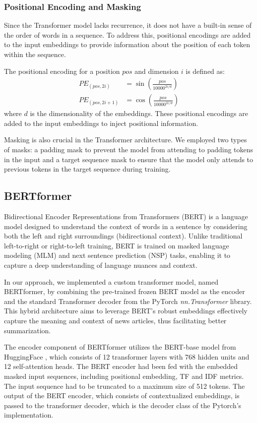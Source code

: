 \subsubsection{Positional Encoding and Masking}

Since the Transformer model lacks recurrence, it does not have a built-in sense of the order of words in a sequence. To address this, positional encodings are added to the input embeddings to provide information about the position of each token within the sequence.

The positional encoding for a position \(pos\) and dimension \(i\) is defined as:
\begin{equation}
	\begin{aligned}
		PE_{(pos, 2i)} &= \sin\left(\frac{pos}{10000^{2i/d}}\right) \\
		PE_{(pos, 2i+1)} &= \cos\left(\frac{pos}{10000^{2i/d}}\right)
	\end{aligned}
\end{equation}
where \(d\) is the dimensionality of the embeddings. These positional encodings are added to the input embeddings to inject positional information.

Masking is also crucial in the Transformer architecture. We employed two types of masks: a padding mask to prevent the model from attending to padding tokens in the input and a target sequence mask to ensure that the model only attends to previous tokens in the target sequence during training.


\subsection{BERTformer}
Bidirectional Encoder Representations from Transformers (BERT)\cite{devlin2018bert} is a language model designed to understand the context of words in a sentence by considering both the left and right surroundings (bidirectional context).
Unlike traditional left-to-right or right-to-left training, BERT is trained on masked language modeling (MLM) and next sentence prediction (NSP) tasks, enabling it to capture a deep understanding of language nuances and context.

In our approach, we implemented a custom transformer model, named BERTformer, by combining the pre-trained frozen BERT model as the encoder and the standard Transformer decoder from the PyTorch \textit{nn.Transformer} library.
This hybrid architecture aims to leverage BERT's robust embeddings effectively capture the meaning and context of news articles, thus facilitating better summarization.

The encoder component of BERTformer utilizes the BERT-base model from HuggingFace \cite{BERTHugginFace}, which consists of 12 transformer layers with 768 hidden units and 12 self-attention heads.
The BERT encoder had been fed with the embedded masked input sequences, including positional embedding, TF and IDF metrics.
The input sequence had to be truncated to a maximum size of 512 tokens.
The output of the BERT encoder, which consists of contextualized embeddings, is passed to the transformer decoder, which is the decoder class of the Pytorch's implementation.
